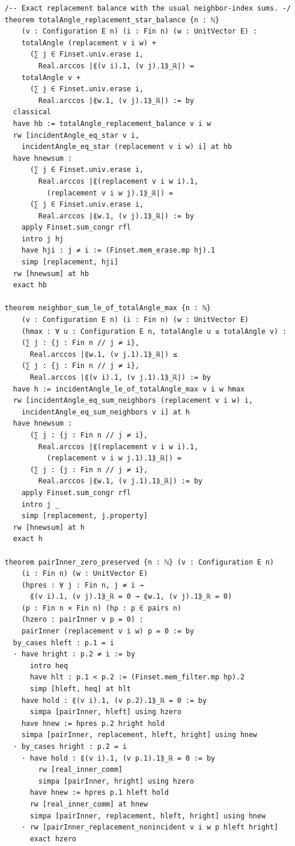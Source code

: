 \documentclass[11pt,a4paper]{article}
\begin{document}
\begin{Verbatim}[breaklines,breakanywhere,fontsize=\footnotesize]
/-- Exact replacement balance with the usual neighbor-index sums. -/
theorem totalAngle_replacement_star_balance {n : ℕ}
    (v : Configuration E n) (i : Fin n) (w : UnitVector E) :
    totalAngle (replacement v i w) +
      (∑ j ∈ Finset.univ.erase i,
        Real.arccos |⟪(v i).1, (v j).1⟫_ℝ|) =
    totalAngle v +
      (∑ j ∈ Finset.univ.erase i,
        Real.arccos |⟪w.1, (v j).1⟫_ℝ|) := by
  classical
  have hb := totalAngle_replacement_balance v i w
  rw [incidentAngle_eq_star v i,
    incidentAngle_eq_star (replacement v i w) i] at hb
  have hnewsum :
      (∑ j ∈ Finset.univ.erase i,
        Real.arccos |⟪(replacement v i w i).1,
          (replacement v i w j).1⟫_ℝ|) =
      (∑ j ∈ Finset.univ.erase i,
        Real.arccos |⟪w.1, (v j).1⟫_ℝ|) := by
    apply Finset.sum_congr rfl
    intro j hj
    have hji : j ≠ i := (Finset.mem_erase.mp hj).1
    simp [replacement, hji]
  rw [hnewsum] at hb
  exact hb

theorem neighbor_sum_le_of_totalAngle_max {n : ℕ}
    (v : Configuration E n) (i : Fin n) (w : UnitVector E)
    (hmax : ∀ u : Configuration E n, totalAngle u ≤ totalAngle v) :
    (∑ j : {j : Fin n // j ≠ i},
      Real.arccos |⟪w.1, (v j.1).1⟫_ℝ|) ≤
    (∑ j : {j : Fin n // j ≠ i},
      Real.arccos |⟪(v i).1, (v j.1).1⟫_ℝ|) := by
  have h := incidentAngle_le_of_totalAngle_max v i w hmax
  rw [incidentAngle_eq_sum_neighbors (replacement v i w) i,
    incidentAngle_eq_sum_neighbors v i] at h
  have hnewsum :
      (∑ j : {j : Fin n // j ≠ i},
        Real.arccos |⟪(replacement v i w i).1,
          (replacement v i w j.1).1⟫_ℝ|) =
      (∑ j : {j : Fin n // j ≠ i},
        Real.arccos |⟪w.1, (v j.1).1⟫_ℝ|) := by
    apply Finset.sum_congr rfl
    intro j _
    simp [replacement, j.property]
  rw [hnewsum] at h
  exact h

theorem pairInner_zero_preserved {n : ℕ} (v : Configuration E n)
    (i : Fin n) (w : UnitVector E)
    (hpres : ∀ j : Fin n, j ≠ i →
      ⟪(v i).1, (v j).1⟫_ℝ = 0 → ⟪w.1, (v j).1⟫_ℝ = 0)
    (p : Fin n × Fin n) (hp : p ∈ pairs n)
    (hzero : pairInner v p = 0) :
    pairInner (replacement v i w) p = 0 := by
  by_cases hleft : p.1 = i
  · have hright : p.2 ≠ i := by
      intro heq
      have hlt : p.1 < p.2 := (Finset.mem_filter.mp hp).2
      simp [hleft, heq] at hlt
    have hold : ⟪(v i).1, (v p.2).1⟫_ℝ = 0 := by
      simpa [pairInner, hleft] using hzero
    have hnew := hpres p.2 hright hold
    simpa [pairInner, replacement, hleft, hright] using hnew
  · by_cases hright : p.2 = i
    · have hold : ⟪(v i).1, (v p.1).1⟫_ℝ = 0 := by
        rw [real_inner_comm]
        simpa [pairInner, hright] using hzero
      have hnew := hpres p.1 hleft hold
      rw [real_inner_comm] at hnew
      simpa [pairInner, replacement, hleft, hright] using hnew
    · rw [pairInner_replacement_nonincident v i w p hleft hright]
      exact hzero


\end{Verbatim}
\end{document}
